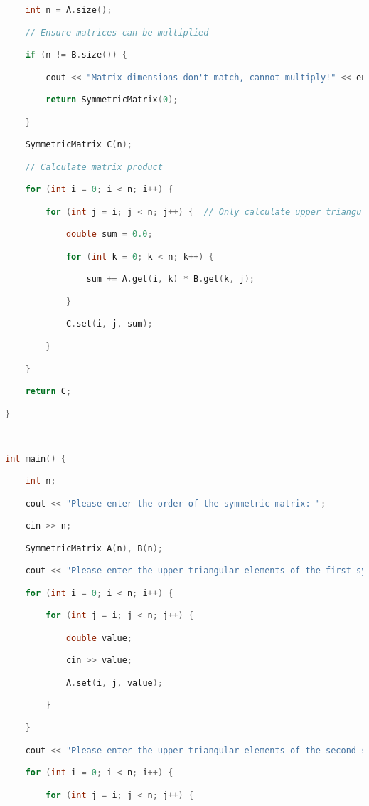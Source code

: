 \begin{lstlisting}[language=C++]
    int n = A.size();

    // Ensure matrices can be multiplied

    if (n != B.size()) {

        cout << "Matrix dimensions don't match, cannot multiply!" << endl;

        return SymmetricMatrix(0);

    }

    SymmetricMatrix C(n);

    // Calculate matrix product

    for (int i = 0; i < n; i++) {

        for (int j = i; j < n; j++) {  // Only calculate upper triangular part

            double sum = 0.0;

            for (int k = 0; k < n; k++) {

                sum += A.get(i, k) * B.get(k, j);

            }

            C.set(i, j, sum);

        }

    }

    return C;

}

  

int main() {

    int n;

    cout << "Please enter the order of the symmetric matrix: ";

    cin >> n;

    SymmetricMatrix A(n), B(n);

    cout << "Please enter the upper triangular elements of the first symmetric matrix:" << endl;

    for (int i = 0; i < n; i++) {

        for (int j = i; j < n; j++) {

            double value;

            cin >> value;

            A.set(i, j, value);

        }

    }

    cout << "Please enter the upper triangular elements of the second symmetric matrix:" << endl;

    for (int i = 0; i < n; i++) {

        for (int j = i; j < n; j++) {


\end{lstlisting}
